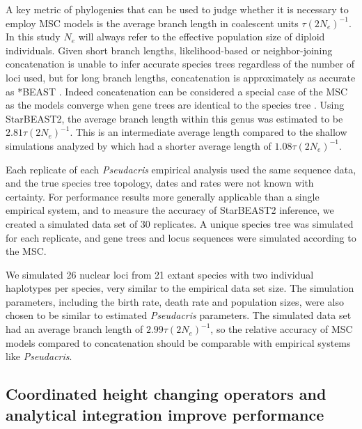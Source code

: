 \documentclass[12pt]{article}
\begin{document}
A key metric of phylogenies that can be used to judge whether it is necessary
to employ MSC models is the average branch length in coalescent units
$\tau(2N_e)^{-1}$. In this study $N_e$ will always refer to the
effective population size of diploid individuals. Given short branch lengths,
likelihood-based or neighbor-joining concatenation is unable to infer accurate
species trees regardless of the number of loci used, but for long branch
lengths, concatenation is approximately as accurate as *BEAST
\citep{Ogilvie01052016}. Indeed concatenation can be considered a special
case of the MSC as the models converge when gene
trees are identical to the species tree \citep{NYAS:NYAS12747}. Using StarBEAST2, the average branch length within
this genus was estimated to be $2.81\tau(2N_e)^{-1}$. This is an
intermediate average length compared to the shallow simulations analyzed by
\cite{Ogilvie01052016} which had a shorter average length of
$1.08\tau(2N_e)^{-1}$.

Each replicate of each \textit{Pseudacris} empirical analysis used the same
sequence data, and the true species tree topology, dates and rates were not
known with certainty. For performance results more generally applicable than a
single empirical system, and to measure the accuracy of StarBEAST2 inference,
we created a simulated data set of 30 replicates. A unique species tree was
simulated for each replicate, and gene trees and locus sequences were
simulated according to the MSC.

We simulated 26 nuclear loci from 21 extant species with two individual
haplotypes per species, very similar to the empirical data set size. The
simulation parameters, including the birth rate, death rate and population
sizes, were also chosen to be similar to estimated \textit{Pseudacris}
parameters. The simulated data set had an average branch length of
$2.99\tau(2N_e)^{-1}$, so the relative accuracy of MSC models compared
to concatenation should be comparable with empirical systems like
\textit{Pseudacris}.

\subsection{Coordinated height changing operators and analytical integration improve performance}
\end{document}
